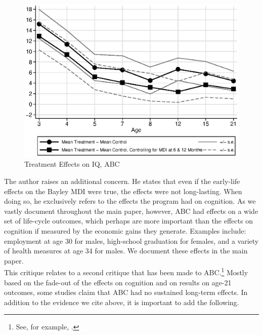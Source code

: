 \begin{appendices}
\begin{figure}[H]
		\caption{Treatment Effects on IQ, ABC} \label{fig:treatiqsabc}
		\includegraphics[width=.9\columnwidth]{output/abc_mdifixing_2.eps}
\end{figure}

\noindent The author raises an additional concern. He states that even if the early-life effects on the Bayley MDI were true, the effects were not long-lasting. When doing so, he exclusively refers to the effects the program had on cognition. As we vastly document throughout the main paper, however, ABC had effects on a wide set of life-cycle outcomes, which perhaps are more important than the effects on cognition if measured by the economic gains they generate. Examples include: employment at age 30 for males, high-school graduation for females, and a variety of health measures at age 34 for males. We document these effects in the main paper.\\

\noindent This critique relates to a second critique that has been made to ABC.\footnote{See, for example, \citet{Besharov-etal_2011_ABCProject}.} Mostly based on the fade-out of the effects on cognition and on results on age-21 outcomes, some studies claim that ABC had no sustained long-term effects. In addition to the evidence we cite above, it is important to add the following.\\


\end{appendices}
